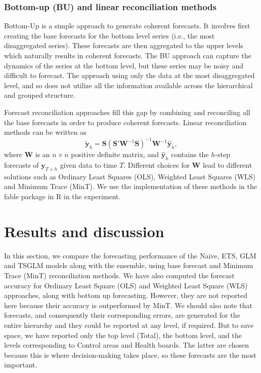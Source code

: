 \documentclass[
  authoryear,
  preprint,
  3p]{elsarticle}
\begin{document}
\hypertarget{bottom-up-bu-and-linear-reconciliation-methods}{%
\subsubsection{Bottom-up (BU) and linear reconciliation
methods}\label{bottom-up-bu-and-linear-reconciliation-methods}}

Bottom-Up is a simple approach to generate coherent forecasts. It
involves first creating the base forecasts for the bottom level series
(i.e., the most disaggregated series). These forecasts are then
aggregated to the upper levels which naturally results in coherent
forecasts. The BU approach can capture the dynamics of the series at the
bottom level, but these series may be noisy and difficult to forecast.
The approach using only the data at the most disaggregated level, and so
does not utilize all the information available across the hierarchical
and grouped structure.

Forecast reconciliation approaches fill this gap by combining and
reconciling all the base forecasts in order to produce coherent
forecasts. Linear reconciliation methods can be written
\citep{WicEtAl2019} as \[
  \tilde{\bm{y}}_h = \bm{S}(\bm{S}'\bm{W}^{-1}\bm{S})^{-1}\bm{W}^{-1}\hat{\bm{y}}_h,
\] where \(\bm{W}\) is an \(n \times n\) positive definite matrix, and
\(\hat{\bm{y}}_h\) contains the \(h\)-step forecasts of \(\bm{y}_{T+h}\)
given data to time \(T\). Different choices for \(\bm{W}\) lead to
different solutions such as Ordinary Least Squares (OLS), Weighted Least
Squares (WLS) and Minimum Trace (MinT). We use the implementation of
these methods in the fable package in R in the experiment.

\hypertarget{sec-results}{%
\section{Results and discussion}\label{sec-results}}

In this section, we compare the forecasting performance of the Naive,
ETS, GLM and TSGLM models along with the ensemble, using base forecast
and Minimum Trace (MinT) reconciliation methods. We have also computed
the forecast accuracy for Ordinary Least Square (OLS) and Weighted Least
Square (WLS) approaches, along with bottom up forecasting. However, they
are not reported here because their accuracy is outperformed by MinT. We
should also note that forecasts, and consequently their corresponding
errors, are generated for the entire hierarchy and they could be
reported at any level, if required. But to save space, we have reported
only the top level (Total), the bottom level, and the levels
corresponding to Control areas and Health boards. The latter are chosen
because this is where decision-making takes place, so these forecasts
are the most important.
\end{document}
